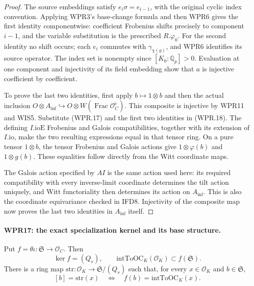 \begin{proof}
The source embeddings satisfy $e_i\sigma=e_{i-1}$, with the
original cyclic index convention. Applying WPR3's base-change
formula and then WPR6 gives the first identity componentwise:
coefficient Frobenius shifts precisely to component $i-1$,
and the variable substitution is the prescribed $R.\varphi_0$.
For the second identity no shift occurs; each $e_i$ commutes
with $\gamma_{\chi(g)}$, and WPR6 identifies its source operator.
The index set is nonempty since $[K_0:\mathbb Q_p]>0$.
Evaluation at one component and injectivity of its field embedding
show that $a$ is injective coefficient by coefficient.

To prove the last two identities, first apply
$b\mapsto1\otimes b$ and then the actual inclusion
$O\otimes A_{\mathrm{inf}}\hookrightarrow O\otimes W(\operatorname{Frac}
\mathcal O_C^\flat)$. This composite is injective by WPR11
and WIS5. Substitute (WPR.17) and the first two identities in
(WPR.18). The defining $I.\mathrm{ioE}$ Frobenius and Galois
compatibilities, together with its extension of $I.\mathrm{io}$,
make the two resulting expressions equal in that tensor ring.
On a pure tensor $1\otimes b$, the tensor Frobenius and Galois
actions give $1\otimes\varphi(b)$ and $1\otimes g(b)$.
These equalities follow directly from the Witt coordinate maps.

The Galois action specified by $AI$ is the same action used here:
its required compatibility with every inverse-limit coordinate
determines the tilt action uniquely, and Witt functoriality then
determines its action on $A_{\mathrm{inf}}$. This is also the coordinate
equivariance checked in IFD8. Injectivity of the composite map
now proves the last two identities in $A_{\mathrm{inf}}$ itself.
\end{proof}

\paragraph{WPR17: the exact specialization kernel and its base structure.}
\label{claim:WPR17}
Put $f=\theta\iota:\mathfrak S\to\mathcal O_C$.
Then
\[
 \ker f=(Q_s),\qquad
 \mathrm{intToOC}_K(\mathcal O_K)\subset f(\mathfrak S).
 \tag{WPR.19}
\]
There is a ring map
$\mathrm{str}:\mathcal O_K\to\mathfrak S/(Q_s)$ such that,
for every $x\in\mathcal O_K$ and $b\in\mathfrak S$,
\[
 [b]=\mathrm{str}(x)
       \quad\Longleftrightarrow\quad f(b)=\mathrm{intToOC}_K(x).
 \tag{WPR.20}
\]

